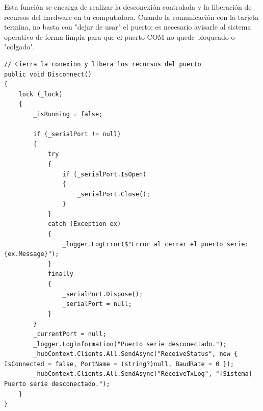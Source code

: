 \documentclass[
10pt, %
a4paper, %
oneside, %
headinclude,footinclude, %
BCOR5mm, %
]{scrartcl}
\begin{document}
Esta función se encarga de realizar la desconexión controlada y la liberación de recursos del hardware en tu computadora. Cuando la comunicación con la tarjeta termina, no basta con "dejar de usar" el puerto; es necesario avisarle al sistema operativo de forma limpia para que el puerto COM no quede bloqueado o "colgado".
\begin{lstlisting}[style=VSCodeDark]
// Cierra la conexion y libera los recursos del puerto
public void Disconnect()
{
	lock (_lock)
	{
		_isRunning = false;
		
		if (_serialPort != null)
		{
			try
			{
				if (_serialPort.IsOpen)
				{
					_serialPort.Close();
				}
			}
			catch (Exception ex)
			{
				_logger.LogError($"Error al cerrar el puerto serie: {ex.Message}");
			}
			finally
			{
				_serialPort.Dispose();
				_serialPort = null;
			}
		}
		_currentPort = null;
		_logger.LogInformation("Puerto serie desconectado.");
		_hubContext.Clients.All.SendAsync("ReceiveStatus", new { IsConnected = false, PortName = (string?)null, BaudRate = 0 });
		_hubContext.Clients.All.SendAsync("ReceiveTxLog", "[Sistema] Puerto serie desconectado.");
	}
}
\end{lstlisting}
\end{document}

